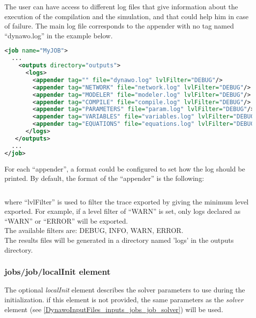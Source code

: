 \documentclass[a4paper, 12pt]{report}
\begin{document}
The user can have access to different log files that give information about the execution of the compilation and the simulation,
and that could help him in case of failure. The main log file corresponds to the appender with no tag named ``dynawo.log'' in the example below.

\begin{lstlisting}[language=XML, morekeywords={logs},numbers=none]
<job name="MyJOB">
  ...
    <outputs directory="outputs">
      <logs>
        <appender tag="" file="dynawo.log" lvlFilter="DEBUG"/>
        <appender tag="NETWORK" file="network.log" lvlFilter="DEBUG"/>
        <appender tag="MODELER" file="modeler.log" lvlFilter="DEBUG"/>
        <appender tag="COMPILE" file="compile.log" lvlFilter="DEBUG"/>
        <appender tag="PARAMETERS" file="param.log" lvlFilter="DEBUG"/>
        <appender tag="VARIABLES" file="variables.log" lvlFilter="DEBUG"/>
        <appender tag="EQUATIONS" file="equations.log" lvlFilter="DEBUG"/>
      </logs>
   </outputs>
  ...
</job>
\end{lstlisting}

For each ``appender'', a format could be configured to set how the log should be printed. By default, the format of the ``appender'' is the following:
\begin{lstlisting}[numbers=none]
%Y-%m-%d %H:%M:%S | <lvlFilter> | log
\end{lstlisting}

where ``lvlFilter'' is used to filter the trace exported by giving the minimum level exported. For example, if a level filter of ``WARN'' is set, only logs declared as ``WARN'' or ``ERROR'' will be exported. \\

The available filters are: DEBUG, INFO, WARN, ERROR.\\

The results files will be generated in a directory named 'logs' in the outputs directory.

\subsubsection{jobs/job/localInit element}
\label{DynawoInputFiles_inputs_jobs_job_localInit}

The optional \textit{localInit} element describes the solver parameters to use during the initialization.
if this element is not provided, the same parameters as the \textit{solver} element (see \ref{DynawoInputFiles_inputs_jobs_job_solver}) will be used.
\end{document}
